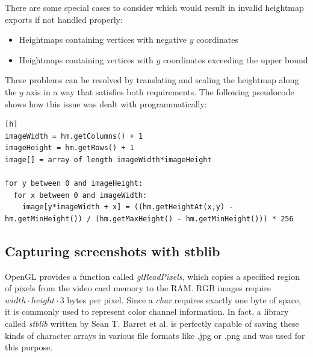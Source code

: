 \documentclass[11pt,a4paper,twoside,openright]{report}
\begin{document}
\noindent There are some special cases to consider which would result in invalid heightmap exports if not handled properly:
\begin{itemize}
  \item Heightmaps containing vertices with negative $y$ coordinates
  \item Heightmaps containing vertices with $y$ coordinates exceeding the upper bound
\end{itemize}
These problems can be resolved by translating and scaling the heightmap along the $y$ axis in a way that satisfies both requirements. The following pseudocode shows how this issue was dealt with programmatically:
\newpage
\begin{lstlisting}[caption=Heightmap export pseudocode][h]
imageWidth = hm.getColumns() + 1
imageHeight = hm.getRows() + 1
image[] = array of length imageWidth*imageHeight

for y between 0 and imageHeight:
  for x between 0 and imageWidth:
    image[y*imageWidth + x] = ((hm.getHeightAt(x,y) - hm.getMinHeight()) / (hm.getMaxHeight() - hm.getMinHeight())) * 256
\end{lstlisting}

\subsection{Capturing screenshots with stblib}
OpenGL provides a function called \emph{glReadPixels}, which copies a specified region of pixels from the video card memory to the RAM. RGB images require $width \cdot height \cdot 3$ bytes per pixel. Since a \emph{char} requires exactly one byte of space, it is commonly used to represent color channel information. In fact, a library called \emph{stblib} written by Sean T. Barret et al. is perfectly capable of saving these kinds of character arrays in various file formats like .jpg or .png and was used for this purpose.
\end{document}
